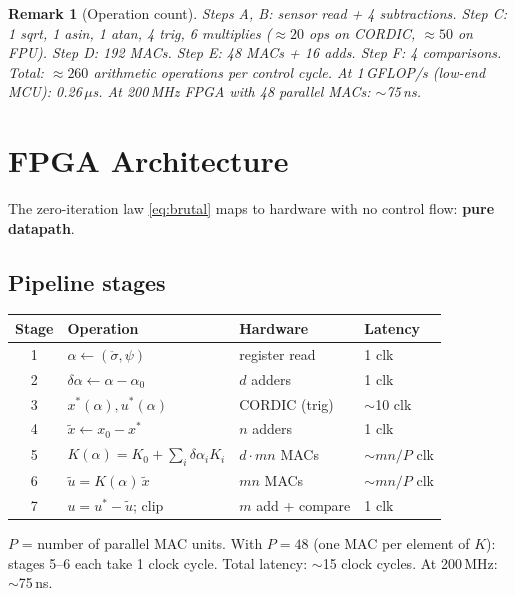 \documentclass[11pt]{article}
\newtheorem{remark}[theorem]{Remark}
\newcommand{\clip}{\mathrm{clip}}
\begin{document}
\begin{remark}[Operation count]
Steps A, B: sensor read + 4 subtractions.
Step C: 1 sqrt, 1 asin, 1 atan, 4 trig, 6 multiplies
($\approx 20$ ops on CORDIC, $\approx 50$ on FPU).
Step D: 192 MACs.
Step E: 48 MACs + 16 adds.
Step F: 4 comparisons.
Total: $\approx 260$ arithmetic operations
per control cycle.
At 1\,GFLOP/s (low-end MCU): 0.26\,$\mu$s.
At 200\,MHz FPGA with 48 parallel MACs:
$\sim$75\,ns.
\end{remark}

\section{FPGA Architecture}\label{sec:fpga}

The zero-iteration law \eqref{eq:brutal}
maps to hardware with no control flow:
\textbf{pure datapath}.

\subsection{Pipeline stages}

\begin{center}
\renewcommand{\arraystretch}{1.3}
\begin{tabular}{@{}c l l l@{}}
\toprule
\textbf{Stage} & \textbf{Operation}
  & \textbf{Hardware} & \textbf{Latency} \\
\midrule
1 & $\alpha \gets (\ddot\sigma, \psi)$
  & register read & 1 clk \\
2 & $\delta\alpha \gets \alpha - \alpha_0$
  & $d$ adders & 1 clk \\
3 & $x^*(\alpha), u^*(\alpha)$
  & CORDIC (trig) & $\sim$10 clk \\
4 & $\tilde x \gets x_0 - x^*$
  & $n$ adders & 1 clk \\
5 & $K(\alpha) = K_0 +
    \sum_i \delta\alpha_i K_i$
  & $d\!\cdot\! mn$ MACs & $\sim$\!$mn/P$ clk \\
6 & $\tilde u = K(\alpha)\,\tilde x$
  & $mn$ MACs & $\sim$\!$mn/P$ clk \\
7 & $u = u^* - \tilde u$;\; $\clip$
  & $m$ add + compare & 1 clk \\
\bottomrule
\end{tabular}
\end{center}

\noindent
$P$ = number of parallel MAC units.
With $P = 48$ (one MAC per element of $K$):
stages 5--6 each take 1 clock cycle.
Total latency: $\sim$15 clock cycles.
At 200\,MHz: $\sim$75\,ns.
\end{document}
